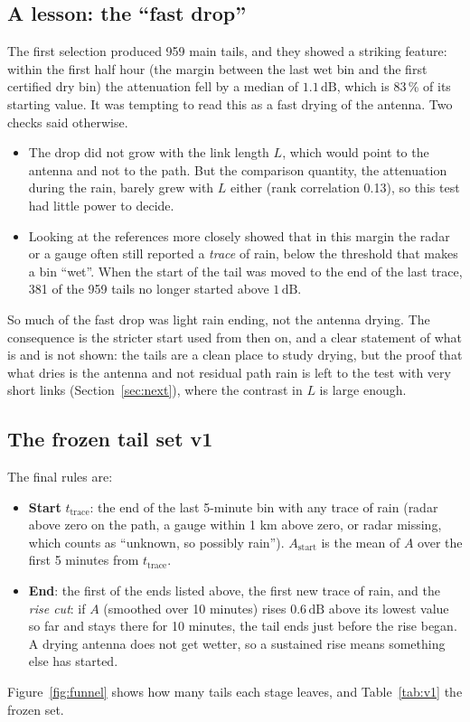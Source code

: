 \documentclass[11pt,a4paper]{article}
\newcommand{\dB}{\,\mathrm{dB}}
\newcommand{\ttrace}{t_{\mathrm{trace}}}
\newcommand{\Astart}{A_{\mathrm{start}}}
\begin{document}
\subsection{A lesson: the ``fast drop''}
\label{sec:fastdrop}

The first selection produced 959 main tails, and they showed a striking feature: within the first half hour (the
margin between the last wet bin and the first certified dry bin) the attenuation fell by a median of $1.1\dB$, which
is 83\,\% of its starting value. It was tempting to read this as a fast drying of the antenna. Two checks said
otherwise.
\begin{itemize}
\item The drop did not grow with the link length $L$, which would point to the antenna and not to the path. But the
comparison quantity, the attenuation during the rain, barely grew with $L$ either (rank correlation 0.13), so this
test had little power to decide.
\item Looking at the references more closely showed that in this margin the radar or a gauge often still reported a
\emph{trace} of rain, below the threshold that makes a bin ``wet''. When the start of the tail was moved to the end of
the last trace, 381 of the 959 tails no longer started above $1\dB$.
\end{itemize}
So much of the fast drop was light rain ending, not the antenna drying. The consequence is the stricter start used
from then on, and a clear statement of what is and is not shown: the tails are a clean place to study drying, but the
proof that what dries is the antenna and not residual path rain is left to the test with very short links
(Section~\ref{sec:next}), where the contrast in $L$ is large enough.

\subsection{The frozen tail set v1}

The final rules are:
\begin{itemize}
\item \textbf{Start} $\ttrace$: the end of the last 5-minute bin with any trace of rain (radar above zero on the
path, a gauge within 1 km above zero, or radar missing, which counts as ``unknown, so possibly rain''). $\Astart$ is
the mean of $A$ over the first 5 minutes from $\ttrace$.
\item \textbf{End}: the first of the ends listed above, the first new trace of rain, and the \emph{rise cut}: if $A$
(smoothed over 10 minutes) rises $0.6\dB$ above its lowest value so far and stays there for 10 minutes, the tail
ends just before the rise began. A drying antenna does not get wetter, so a sustained rise means something else has
started.
\end{itemize}
Figure~\ref{fig:funnel} shows how many tails each stage leaves, and Table~\ref{tab:v1} the frozen set.
\end{document}
